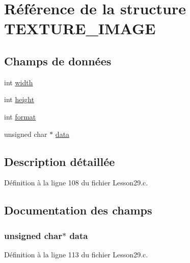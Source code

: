 \hypertarget{struct_t_e_x_t_u_r_e___i_m_a_g_e}{}\section{Référence de la structure T\+E\+X\+T\+U\+R\+E\+\_\+\+I\+M\+A\+G\+E}
\label{struct_t_e_x_t_u_r_e___i_m_a_g_e}
\subsection*{Champs de données}
\begin{DoxyCompactItemize}
\item 
int \hyperlink{struct_t_e_x_t_u_r_e___i_m_a_g_e_a2474a5474cbff19523a51eb1de01cda4}{width}
\item 
int \hyperlink{struct_t_e_x_t_u_r_e___i_m_a_g_e_ad12fc34ce789bce6c8a05d8a17138534}{height}
\item 
int \hyperlink{struct_t_e_x_t_u_r_e___i_m_a_g_e_a317afff57d87a89158c2b038d37b2b08}{format}
\item 
unsigned char $\ast$ \hyperlink{struct_t_e_x_t_u_r_e___i_m_a_g_e_ac24cea2bfcc927fd29bc74d1086707d8}{data}
\end{DoxyCompactItemize}


\subsection{Description détaillée}


Définition à la ligne 108 du fichier Lesson29.\+c.



\subsection{Documentation des champs}
\hypertarget{struct_t_e_x_t_u_r_e___i_m_a_g_e_ac24cea2bfcc927fd29bc74d1086707d8}{}
\subsubsection[{data}]{\setlength{\rightskip}{0pt plus 5cm}unsigned char$\ast$ data}\label{struct_t_e_x_t_u_r_e___i_m_a_g_e_ac24cea2bfcc927fd29bc74d1086707d8}


Définition à la ligne 113 du fichier Lesson29.\+c.

